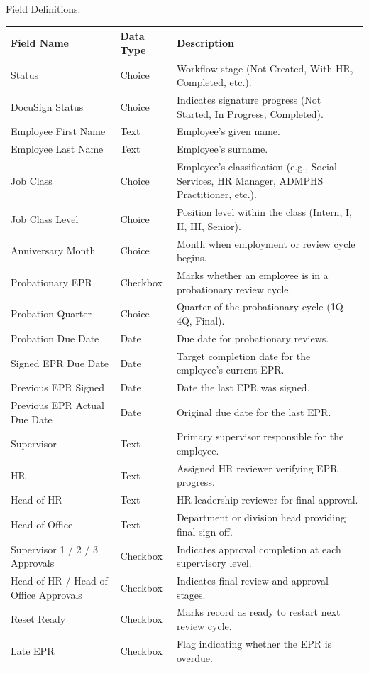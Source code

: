\documentclass[12pt]{article}
\def\textbf#1{#1}%
\begin{document}
\textbf{Field Definitions:}
\begin{tabular}{|p{3.2cm}|p{3cm}|p{8cm}|}
\hline
\textbf{Field Name} & \textbf{Data Type} & \textbf{Description} \\ \hline
Status & Choice & Workflow stage (Not Created, With HR, Completed, etc.). \\ \hline
DocuSign Status & Choice & Indicates signature progress (Not Started, In Progress, Completed). \\ \hline
Employee First Name & Text & Employee’s given name. \\ \hline
Employee Last Name & Text & Employee’s surname. \\ \hline
Job Class & Choice & Employee’s classification (e.g., Social Services, HR Manager, ADMPHS Practitioner, etc.). \\ \hline
Job Class Level & Choice & Position level within the class (Intern, I, II, III, Senior). \\ \hline
Anniversary Month & Choice & Month when employment or review cycle begins. \\ \hline
Probationary EPR & Checkbox & Marks whether an employee is in a probationary review cycle. \\ \hline
Probation Quarter & Choice & Quarter of the probationary cycle (1Q–4Q, Final). \\ \hline
Probation Due Date & Date & Due date for probationary reviews. \\ \hline
Signed EPR Due Date & Date & Target completion date for the employee’s current EPR. \\ \hline
Previous EPR Signed & Date & Date the last EPR was signed. \\ \hline
Previous EPR Actual Due Date & Date & Original due date for the last EPR. \\ \hline
Supervisor & Text & Primary supervisor responsible for the employee. \\ \hline
HR & Text & Assigned HR reviewer verifying EPR progress. \\ \hline
Head of HR & Text & HR leadership reviewer for final approval. \\ \hline
Head of Office & Text & Department or division head providing final sign-off. \\ \hline
Supervisor 1 / 2 / 3 Approvals & Checkbox & Indicates approval completion at each supervisory level. \\ \hline
Head of HR / Head of Office Approvals & Checkbox & Indicates final review and approval stages. \\ \hline
Reset Ready & Checkbox & Marks record as ready to restart next review cycle. \\ \hline
Late EPR & Checkbox & Flag indicating whether the EPR is overdue. \\ \hline
\end{tabular}
\end{document}
